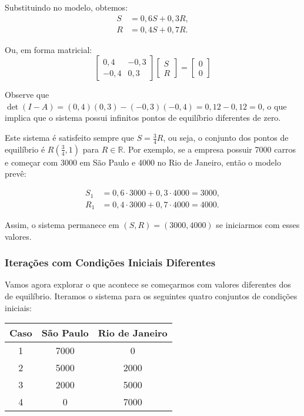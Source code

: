\documentclass{article}
\begin{document}
Substituindo no modelo, obtemos:
\begin{align*}
S &= 0{,}6 S + 0{,}3 R, \\
R &= 0{,}4 S + 0{,}7 R.
\end{align*}

Ou, em forma matricial:
\[
\begin{bmatrix}
0{,}4 & -0{,}3 \\
-0{,}4 & 0{,}3
\end{bmatrix}
\begin{bmatrix}
S \\ R
\end{bmatrix}
=
\begin{bmatrix}
0 \\ 0
\end{bmatrix}
\]

Observe que
\(\det(I - A) = (0{,}4)(0{,}3) - (-0{,}3)(-0{,}4) = 0{,}12 - 0{,}12 =
0\), o que implica que o sistema possui infinitos pontos de equilíbrio
diferentes de zero.


Este sistema é satisfeito sempre que \( S = \frac{3}{4} R \), ou seja,
o conjunto dos pontos de equilíbrio é \( R ( \tfrac{3}{4} , 1 ) \) para
$R \in \mathbb{R}$. Por exemplo, se a empresa possuir 7000 carros e
começar com 3000 em São Paulo e 4000 no Rio de Janeiro, então o modelo
prevê:

\begin{align*}
  S_1 &= 0{,}6 \cdot 3000 + 0{,}3 \cdot 4000 = 3000, \\
  R_1 &= 0{,}4 \cdot 3000 + 0{,}7 \cdot 4000 = 4000.
\end{align*}

Assim, o sistema permanece em \( (S, R) = (3000, 4000) \) se iniciarmos
com esses valores.

\subsubsection{Iterações com Condições Iniciais Diferentes}

Vamos agora explorar o que acontece se começarmos com valores diferentes dos de equilíbrio. Iteramos o sistema para os seguintes quatro conjuntos de condições iniciais:

\begin{center}
\begin{tabular}{|c|c|c|}
\hline
\textbf{Caso} & \textbf{São Paulo} & \textbf{Rio de Janeiro} \\
\hline
1 & 7000 & 0 \\
2 & 5000 & 2000 \\
3 & 2000 & 5000 \\
4 & 0    & 7000 \\
\hline
\end{tabular}
\end{center}
\end{document}
